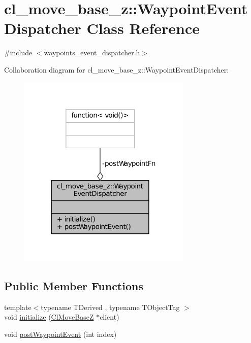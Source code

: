 \hypertarget{classcl__move__base__z_1_1WaypointEventDispatcher}{}\section{cl\+\_\+move\+\_\+base\+\_\+z\+:\+:Waypoint\+Event\+Dispatcher Class Reference}
\label{classcl__move__base__z_1_1WaypointEventDispatcher}


{\ttfamily \#include $<$waypoints\+\_\+event\+\_\+dispatcher.\+h$>$}



Collaboration diagram for cl\+\_\+move\+\_\+base\+\_\+z\+:\+:Waypoint\+Event\+Dispatcher\+:
\nopagebreak
\begin{figure}[H]
\begin{center}
\leavevmode
\includegraphics[width=234pt]{classcl__move__base__z_1_1WaypointEventDispatcher__coll__graph}
\end{center}
\end{figure}
\subsection*{Public Member Functions}
\begin{DoxyCompactItemize}
\item 
{\footnotesize template$<$typename T\+Derived , typename T\+Object\+Tag $>$ }\\void \hyperlink{classcl__move__base__z_1_1WaypointEventDispatcher_a89674461d32af85dd64ca49290dbd010}{initialize} (\hyperlink{classcl__move__base__z_1_1ClMoveBaseZ}{Cl\+Move\+BaseZ} $\ast$client)
\item 
void \hyperlink{classcl__move__base__z_1_1WaypointEventDispatcher_a6462eae610b97df2207ecd93c1544aaf}{post\+Waypoint\+Event} (int index)
\end{DoxyCompactItemize}
